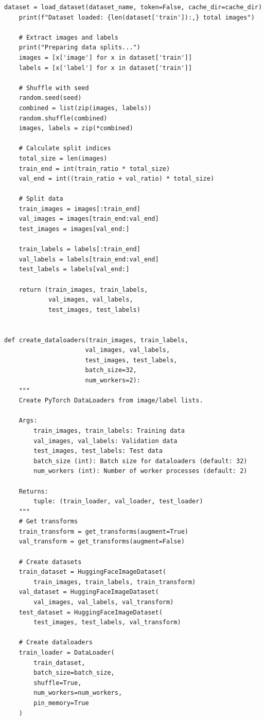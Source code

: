 \documentclass[man,12pt,letterpaper,donotrepeattitle,floatsintext]{apa7}
\begin{document}
\begin{lstlisting}[style=pythonstyle]
    dataset = load_dataset(dataset_name, token=False, cache_dir=cache_dir)
    print(f"Dataset loaded: {len(dataset['train']):,} total images")
    
    # Extract images and labels
    print("Preparing data splits...")
    images = [x['image'] for x in dataset['train']]
    labels = [x['label'] for x in dataset['train']]
    
    # Shuffle with seed
    random.seed(seed)
    combined = list(zip(images, labels))
    random.shuffle(combined)
    images, labels = zip(*combined)
    
    # Calculate split indices
    total_size = len(images)
    train_end = int(train_ratio * total_size)
    val_end = int((train_ratio + val_ratio) * total_size)
    
    # Split data
    train_images = images[:train_end]
    val_images = images[train_end:val_end]
    test_images = images[val_end:]
    
    train_labels = labels[:train_end]
    val_labels = labels[train_end:val_end]
    test_labels = labels[val_end:]
    
    return (train_images, train_labels,
            val_images, val_labels,
            test_images, test_labels)


def create_dataloaders(train_images, train_labels,
                      val_images, val_labels,
                      test_images, test_labels,
                      batch_size=32,
                      num_workers=2):
    """
    Create PyTorch DataLoaders from image/label lists.
    
    Args:
        train_images, train_labels: Training data
        val_images, val_labels: Validation data
        test_images, test_labels: Test data
        batch_size (int): Batch size for dataloaders (default: 32)
        num_workers (int): Number of worker processes (default: 2)
    
    Returns:
        tuple: (train_loader, val_loader, test_loader)
    """
    # Get transforms
    train_transform = get_transforms(augment=True)
    val_transform = get_transforms(augment=False)
    
    # Create datasets
    train_dataset = HuggingFaceImageDataset(
        train_images, train_labels, train_transform)
    val_dataset = HuggingFaceImageDataset(
        val_images, val_labels, val_transform)
    test_dataset = HuggingFaceImageDataset(
        test_images, test_labels, val_transform)
    
    # Create dataloaders
    train_loader = DataLoader(
        train_dataset,
        batch_size=batch_size,
        shuffle=True,
        num_workers=num_workers,
        pin_memory=True
    )
    

\end{lstlisting}
\end{document}

